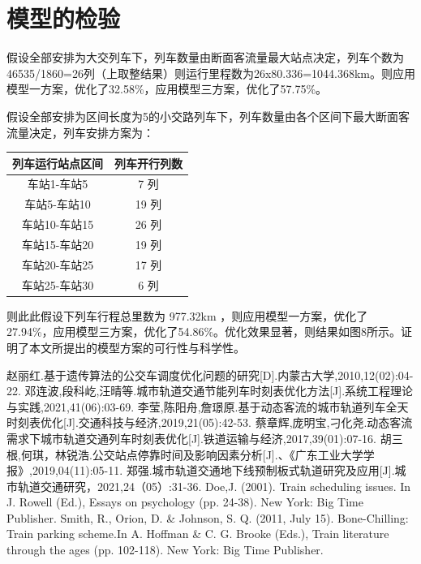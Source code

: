\documentclass[UTF8]{ctexart}
\begin{document}
\section{模型的检验}
假设全部安排为大交列车下，列车数量由断面客流量最大站点决定，列车个数为46535/1860=26列（上取整结果）则运行里程数为26x80.336=1044.368km。则应用模型一方案，优化了32.58\%，应用模型三方案，优化了57.75\%。 \par
假设全部安排为区间长度为5的小交路列车下，列车数量由各个区间下最大断面客流量决定，列车安排方案为： \par
	\begin{center}
	\begin{tabular}{c|c} 
		\textbf{列车运行站点区间} & \textbf{列车开行列数} \\
		\hline
		车站1-车站5 & 7 列 \\
		车站5-车站10 & 19 列 \\
		车站10-车站15 & 26 列 \\
		车站15-车站20 & 19 列 \\
		车站20-车站25 & 17 列 \\
		车站25-车站30 & 6 列 \\
	\end{tabular}
\end{center}\par
则此此假设下列车行程总里数为 977.32km ，则应用模型一方案，优化了 27.94\%，应用模型三方案，优化了54.86\%。优化效果显著，则结果如图8所示。证明了本文所提出的模型方案的可行性与科学性。 \par
\begin{thebibliography}{40}
	赵丽红.基于遗传算法的公交车调度优化问题的研究[D].内蒙古大学,2010,12(02):04-22.
	邓连波,段科屹,汪晴等.城市轨道交通节能列车时刻表优化方法[J].系统工程理论与实践,2021,41(06):03-69.
	李莹,陈阳舟,詹璟原.基于动态客流的城市轨道列车全天时刻表优化[J].交通科技与经济,2019,21(05):42-53.
	蔡章辉,庞明宝,刁化尧.动态客流需求下城市轨道交通列车时刻表优化[J].铁道运输与经济,2017,39(01):07-16.
	胡三根,何琪，林锐浩.公交站点停靠时间及影响因素分析[J].、《广东工业大学学报》,2019,04(11):05-11.
	郑强.城市轨道交通地下线预制板式轨道研究及应用[J].城市轨道交通研究，2021,24（05）:31-36.
	Doe,J. (2001). Train scheduling issues. In J. Rowell (Ed.), Essays on psychology (pp. 24-38). New York: Big Time Publisher.
	Smith, R., Orion, D. \& Johnson, S. Q. (2011, July 15). Bone-Chilling: Train parking scheme.In A. Hoffman \& C. G. Brooke (Eds.), Train literature through the ages (pp. 102-118). New York: Big Time Publisher.
	
	
	
	
\end{thebibliography}
\newpage
{}	%
\end{document}

